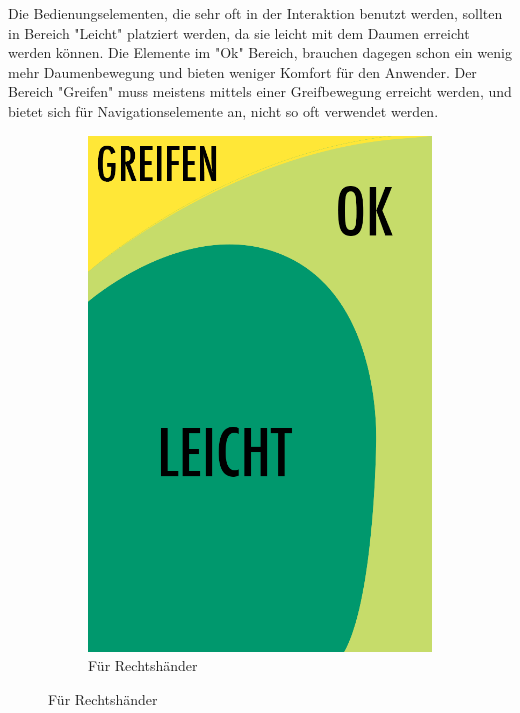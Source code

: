 Die Bedienungselementen, die sehr oft in der Interaktion benutzt werden, sollten in Bereich "Leicht" platziert werden, da sie leicht mit dem Daumen erreicht werden können. Die Elemente im "Ok" Bereich, brauchen dagegen schon ein wenig mehr Daumenbewegung und bieten weniger Komfort für den Anwender. Der Bereich "Greifen" muss meistens mittels einer Greifbewegung erreicht werden, und bietet sich für Navigationselemente an, nicht so oft verwendet werden.

\begin{figure}
	\centering
	\begin{subfigure}[b]{0.3\textwidth}
		\centering
			\includegraphics[width=1\textwidth]{img/anordungDerElementeSimple.png}
			\caption{Für Rechtshänder\linebreak}\label{fig:rechtsPositioning}

\end{subfigure}
\end{figure}
